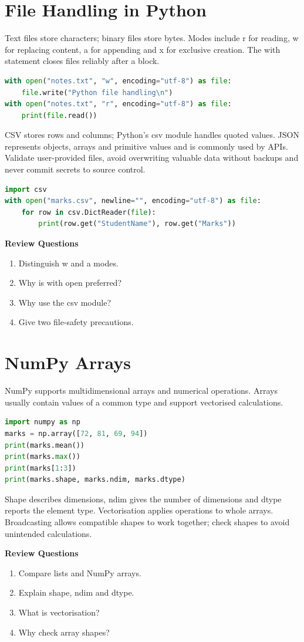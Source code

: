 \documentclass[11pt,openany,oneside]{book}
\newcommand{\reviewtitle}{\par\noindent\textbf{\color{Navy}Review Questions}\par}
\newcommand{\review}[1]{\par\smallskip\reviewtitle\begin{enumerate}[label=\arabic*.,leftmargin=1.8em,itemsep=1pt,topsep=2pt]\small #1\end{enumerate}\smallskip}
\begin{document}
\chapter{File Handling in Python}
Text files store characters; binary files store bytes. Modes include r for reading, w for replacing content, a for appending and x for exclusive creation. The with statement closes files reliably after a block.
\begin{lstlisting}[language=Python]
with open("notes.txt", "w", encoding="utf-8") as file:
    file.write("Python file handling\n")
with open("notes.txt", "r", encoding="utf-8") as file:
    print(file.read())
\end{lstlisting}
CSV stores rows and columns; Python's csv module handles quoted values. JSON represents objects, arrays and primitive values and is commonly used by APIs. Validate user-provided files, avoid overwriting valuable data without backups and never commit secrets to source control.
\begin{lstlisting}[language=Python]
import csv
with open("marks.csv", newline="", encoding="utf-8") as file:
    for row in csv.DictReader(file):
        print(row.get("StudentName"), row.get("Marks"))
\end{lstlisting}
\review{\item Distinguish w and a modes.\item Why is with open preferred?\item Why use the csv module?\item Give two file-safety precautions.}
\chapter{NumPy Arrays}
NumPy supports multidimensional arrays and numerical operations. Arrays usually contain values of a common type and support vectorised calculations.
\begin{lstlisting}[language=Python]
import numpy as np
marks = np.array([72, 81, 69, 94])
print(marks.mean())
print(marks.max())
print(marks[1:3])
print(marks.shape, marks.ndim, marks.dtype)
\end{lstlisting}
Shape describes dimensions, ndim gives the number of dimensions and dtype reports the element type. Vectorisation applies operations to whole arrays. Broadcasting allows compatible shapes to work together; check shapes to avoid unintended calculations.
\review{\item Compare lists and NumPy arrays.\item Explain shape, ndim and dtype.\item What is vectorisation?\item Why check array shapes?}
\end{document}
